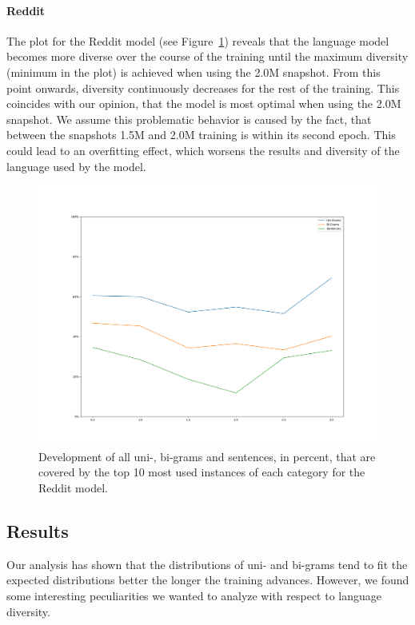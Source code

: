 \paragraph{Reddit} The plot for the Reddit model (see Figure~\ref{results:language_model:diversity:reddit}) reveals that the language model becomes more diverse over the course of the training until the maximum diversity (minimum in the plot) is achieved when using the 2.0M snapshot. From this point onwards, diversity continuously decreases for the rest of the training. This coincides with our opinion, that the model is most optimal when using the 2.0M snapshot. We assume this problematic behavior is caused by the fact, that between the snapshots 1.5M and 2.0M training is within its second epoch. This could lead to an overfitting effect, which worsens the results and diversity of the language used by the model.

\begin{figure}[H]
	\includegraphics[width=\linewidth]{img/plots/reddit/diversity_perc_plot.png}
	\caption{Development of all uni-, bi-grams and sentences, in percent, that are covered by the top 10 most used instances of each category for the Reddit model.}
	\label{results:language_model:diversity:reddit}
\end{figure}

\subsection{Results}
Our analysis has shown that the distributions of uni- and bi-grams tend to fit the expected distributions better the longer the training advances. However, we found some interesting peculiarities we wanted to analyze with respect to language diversity.

